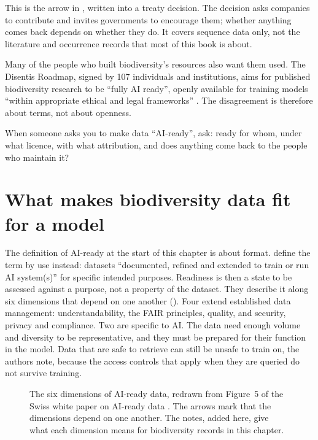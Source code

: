This is the arrow in , written into a treaty decision. The
decision asks companies to contribute and invites governments to encourage
them; whether anything comes back depends on whether they do. It covers
sequence data only, not the literature and occurrence records that most of
this book is about.

Many of the people who
built biodiversity's resources also want them used. The Disentis Roadmap, signed by
107 individuals and institutions, aims for published biodiversity research to be
``fully AI ready'', openly available for training models ``within appropriate
ethical and legal frameworks'' \parencite{agosti2026disentis}. The disagreement
is therefore about terms, not about openness.

\begin{keypoint}
When someone asks you to make data ``AI-ready'', ask: ready for whom, under what
licence, with what attribution, and does anything come back to the people who
maintain it?
\end{keypoint}

\section{What makes biodiversity data fit for a model}
\label{sec:fitformodel}

The definition of AI-ready at the start of this chapter is about format.
\textcite{legner2026aireadydata} define the term by use instead: datasets
``documented, refined and extended to train or run AI system(s)'' for specific
intended purposes. Readiness is then a state to be assessed against a purpose,
not a property of the dataset. They describe it along six dimensions that
depend on one another (). Four extend established data
management: understandability, the FAIR principles, quality, and security,
privacy and compliance. Two are specific to AI. The data need enough volume and
diversity to be representative, and they must be prepared for their function
in the model. Data that are safe to retrieve can still be unsafe to
train on, the authors note, because the access controls that apply when they
are queried do not survive training.

\begin{figure}[htbp]
\centering
{}
\caption{The six dimensions of AI-ready data, redrawn from Figure~5 of the
Swiss white paper on AI-ready data \parencite{legner2026aireadydata}. The arrows
mark that the dimensions depend on one another. The notes, added here, give
what each dimension means for biodiversity records in this chapter.}
\label{fig:sixdimensions}
\end{figure}

